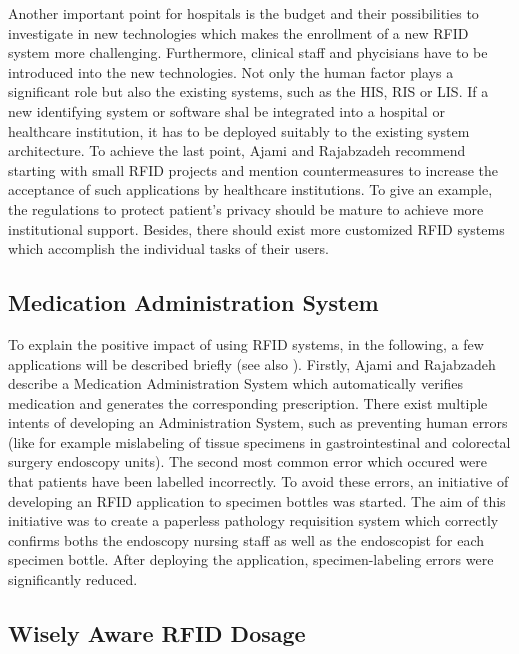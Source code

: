 Another important point for hospitals is the budget and their possibilities to investigate in new technologies which makes the enrollment of a new RFID system more challenging. Furthermore, clinical staff and phycisians have to be introduced into the new technologies. Not only the human factor plays a significant role but also the existing systems, such as the \ac{HIS}, \ac{RIS} or \ac{LIS}. If a new identifying system or software shal be integrated into a hospital or healthcare institution, it has to be deployed suitably to the existing system architecture. To achieve the last point, Ajami and Rajabzadeh \cite{ncbi} recommend starting with small RFID projects and mention countermeasures to increase the acceptance of such applications by healthcare institutions. To give an example, the regulations to protect patient's privacy should be mature to achieve more institutional support. Besides, there should exist more customized RFID systems which accomplish the individual tasks of their users.  

\subsection{Medication Administration System}

To explain the positive impact of using RFID systems, in the following, a few applications will be described briefly (see also \cite{ncbi}). Firstly, Ajami and Rajabzadeh describe a Medication Administration System which automatically verifies medication and generates the corresponding prescription. There exist multiple intents of developing an Administration System, such as preventing human errors (like for example mislabeling of tissue specimens in gastrointestinal and colorectal surgery endoscopy units). The second most common error which occured were that patients have been labelled incorrectly. To avoid these errors, an initiative of developing an RFID application to specimen bottles was started. The aim of this initiative was to create a paperless pathology requisition system which correctly confirms boths the endoscopy nursing staff as well as the endoscopist for each specimen bottle. After deploying the application, specimen-labeling errors were significantly reduced.

\subsection{Wisely Aware RFID Dosage}

